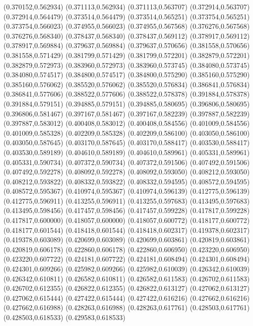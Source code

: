 (0.370152,0.562934)
(0.371113,0.562934)
(0.371113,0.563707)
(0.372914,0.563707)
(0.372914,0.564479)
(0.373514,0.564479)
(0.373514,0.565251)
(0.373754,0.565251)
(0.373754,0.566023)
(0.374955,0.566023)
(0.374955,0.567568)
(0.376276,0.567568)
(0.376276,0.568340)
(0.378437,0.568340)
(0.378437,0.569112)
(0.378917,0.569112)
(0.378917,0.569884)
(0.379637,0.569884)
(0.379637,0.570656)
(0.381558,0.570656)
(0.381558,0.571429)
(0.381799,0.571429)
(0.381799,0.572201)
(0.382879,0.572201)
(0.382879,0.572973)
(0.383960,0.572973)
(0.383960,0.573745)
(0.384080,0.573745)
(0.384080,0.574517)
(0.384800,0.574517)
(0.384800,0.575290)
(0.385160,0.575290)
(0.385160,0.576062)
(0.385520,0.576062)
(0.385520,0.576834)
(0.386841,0.576834)
(0.386841,0.577606)
(0.388522,0.577606)
(0.388522,0.578378)
(0.391884,0.578378)
(0.391884,0.579151)
(0.394885,0.579151)
(0.394885,0.580695)
(0.396806,0.580695)
(0.396806,0.581467)
(0.397167,0.581467)
(0.397167,0.582239)
(0.397887,0.582239)
(0.397887,0.583012)
(0.400408,0.583012)
(0.400408,0.584556)
(0.401009,0.584556)
(0.401009,0.585328)
(0.402209,0.585328)
(0.402209,0.586100)
(0.403050,0.586100)
(0.403050,0.587645)
(0.403170,0.587645)
(0.403170,0.588417)
(0.403530,0.588417)
(0.403530,0.589189)
(0.404610,0.589189)
(0.404610,0.589961)
(0.405331,0.589961)
(0.405331,0.590734)
(0.407372,0.590734)
(0.407372,0.591506)
(0.407492,0.591506)
(0.407492,0.592278)
(0.408092,0.592278)
(0.408092,0.593050)
(0.408212,0.593050)
(0.408212,0.593822)
(0.408332,0.593822)
(0.408332,0.594595)
(0.408572,0.594595)
(0.408572,0.595367)
(0.410974,0.595367)
(0.410974,0.596139)
(0.412775,0.596139)
(0.412775,0.596911)
(0.413255,0.596911)
(0.413255,0.597683)
(0.413495,0.597683)
(0.413495,0.598456)
(0.417457,0.598456)
(0.417457,0.599228)
(0.417817,0.599228)
(0.417817,0.600000)
(0.418057,0.600000)
(0.418057,0.600772)
(0.418177,0.600772)
(0.418177,0.601544)
(0.418418,0.601544)
(0.418418,0.602317)
(0.419378,0.602317)
(0.419378,0.603089)
(0.420699,0.603089)
(0.420699,0.603861)
(0.420819,0.603861)
(0.420819,0.606178)
(0.422860,0.606178)
(0.422860,0.606950)
(0.423220,0.606950)
(0.423220,0.607722)
(0.424181,0.607722)
(0.424181,0.608494)
(0.424301,0.608494)
(0.424301,0.609266)
(0.425982,0.609266)
(0.425982,0.610039)
(0.426342,0.610039)
(0.426342,0.610811)
(0.426582,0.610811)
(0.426582,0.611583)
(0.426702,0.611583)
(0.426702,0.612355)
(0.426822,0.612355)
(0.426822,0.613127)
(0.427062,0.613127)
(0.427062,0.615444)
(0.427422,0.615444)
(0.427422,0.616216)
(0.427662,0.616216)
(0.427662,0.616988)
(0.428263,0.616988)
(0.428263,0.617761)
(0.428503,0.617761)
(0.428503,0.618533)
(0.429583,0.618533)
